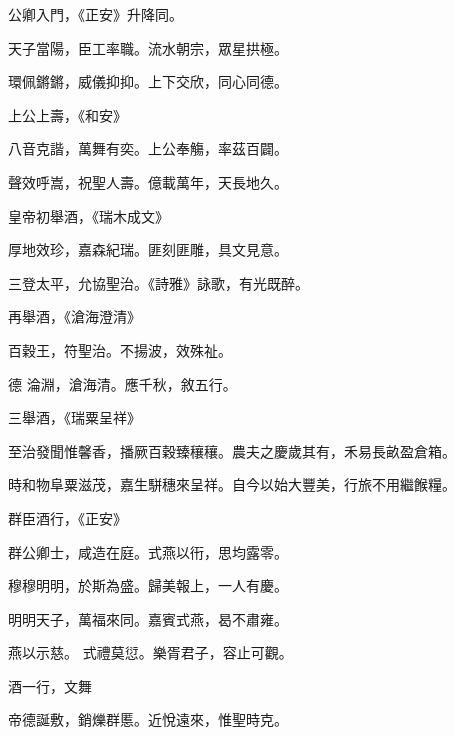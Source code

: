 \begin{pinyinscope}
 公卿入門，《正安》升降同。



 天子當陽，臣工率職。流水朝宗，眾星拱極。



 環佩鏘鏘，威儀抑抑。上下交欣，同心同德。



 上公上壽，《和安》



 八音克諧，萬舞有奕。上公奉觴，率茲百闢。



 聲效呼嵩，祝聖人壽。億載萬年，天長地久。



 皇帝初舉酒，《瑞木成文》



 厚地效珍，嘉森紀瑞。匪刻匪雕，具文見意。



 三登太平，允協聖治。《詩雅》詠歌，有光既醉。



 再舉酒，《滄海澄清》



 百穀王，符聖治。不揚波，效殊祉。



 德
 淪淵，滄海清。應千秋，敘五行。



 三舉酒，《瑞粟呈祥》



 至治發聞惟馨香，播厥百穀臻穰穰。農夫之慶歲其有，禾易長畝盈倉箱。



 時和物阜粟滋茂，嘉生駢穗來呈祥。自今以始大豐美，行旅不用繼餱糧。



 群臣酒行，《正安》



 群公卿士，咸造在庭。式燕以衎，思均露零。



 穆穆明明，於斯為盛。歸美報上，一人有慶。



 明明天子，萬福來同。嘉賓式燕，曷不肅雍。



 燕以示慈。
 式禮莫愆。樂胥君子，容止可觀。



 酒一行，文舞



 帝德誕敷，銷爍群慝。近悅遠來，惟聖時克。




\end{pinyinscope}
